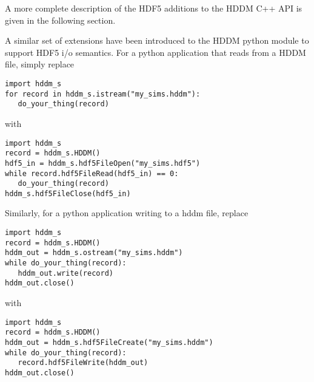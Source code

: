 \documentclass{revtex4}
\begin{document}
A more complete description of the HDF5 additions to the HDDM C++ API is
given in the following section.

A similar set of extensions have been introduced to the HDDM python module
to support HDF5 i/o semantics. For a python application that reads from a
HDDM file, simply replace

\vspace{0.5cm}
\begin{minipage}{12cm}
\begin{verbatim}
import hddm_s
for record in hddm_s.istream("my_sims.hddm"):
   do_your_thing(record)
\end{verbatim}
\end{minipage}
\vspace{0.5cm}

with

\vspace{0.5cm}
\begin{minipage}{12cm}
\begin{verbatim}
import hddm_s
record = hddm_s.HDDM()
hdf5_in = hddm_s.hdf5FileOpen("my_sims.hdf5")
while record.hdf5FileRead(hdf5_in) == 0:
   do_your_thing(record)
hddm_s.hdf5FileClose(hdf5_in)
\end{verbatim}
\end{minipage}
\vspace{0.5cm}

Similarly, for a python application writing to a hddm file, replace

\vspace{0.5cm}
\begin{minipage}{12cm}
\begin{verbatim}
import hddm_s
record = hddm_s.HDDM()
hddm_out = hddm_s.ostream("my_sims.hddm")
while do_your_thing(record):
   hddm_out.write(record)
hddm_out.close()
\end{verbatim}
\end{minipage}
\vspace{0.5cm}

with

\vspace{0.5cm}
\begin{minipage}{12cm}
\begin{verbatim}
import hddm_s
record = hddm_s.HDDM()
hddm_out = hddm_s.hdf5FileCreate("my_sims.hddm")
while do_your_thing(record):
   record.hdf5FileWrite(hddm_out)
hddm_out.close()
\end{verbatim}
\end{minipage}
\vspace{0.5cm}
\end{document}
